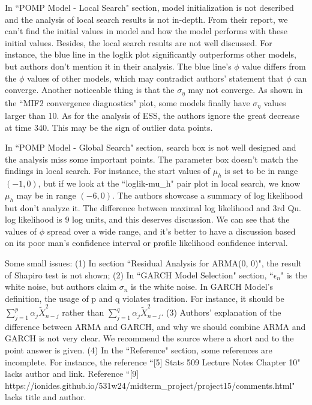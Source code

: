 \documentclass[12pt]{article}
\begin{document}
In ``POMP Model - Local Search" section, model initialization is not described and the analysis of local search results is not in-depth. From their report, we can't find the initial values in model and how the model performs with these initial values. Besides, the local search results are not well discussed. For instance, the blue line in the loglik plot significantly outperforms other models, but authors don't mention it in their analysis. The blue line's $\phi$ value differs from the $\phi$ values of other models, which may contradict authors' statement that $\phi$ can converge. Another noticeable thing is that the $\sigma_{\eta}$ may not converge. As shown in the ``MIF2 convergence diagnostics" plot, some models finally have $\sigma_{\eta}$ values larger than 10. As for the analysis of ESS, the authors ignore the great decrease at time 340. This may be the sign of outlier data points.


In ``POMP Model - Global Search" section, search box is not well designed and the analysis miss some important points. The parameter box doesn't match the findings in local search. For instance, the start values of $\mu_h$ is set to be in range $(-1, 0)$, but if we look at the ``loglik-mu\_h" pair plot in local search, we know $\mu_h$ may be in range $(-6, 0)$. The authors showcase a summary of log likelihood but don't analyze it. The difference between maximal log likelihood and 3rd Qu. log likelihood is 9 log units, and this deserves discussion. We can see that the values of $\phi$ spread over a wide range, and it's better to have a discussion based on its poor man's confidence interval or profile likelihood confidence interval.


Some small issues: (1) In section ``Residual Analysis for ARMA(0, 0)", the result of Shapiro test is not shown; (2) In ``GARCH Model Selection" section, ``$\epsilon_n$" is the white noise, but authors claim $\sigma_n$ is the white noise. In GARCH Model's definition, the usage of p and q violates tradition. For instance, it should be $\sum_{j = 1}^p \alpha_j \tilde{X}_{n - j}^2$ rather than $\sum_{j = 1}^q \alpha_j \tilde{X}_{n - j}^2$. (3) Authors' explanation of the difference between ARMA and GARCH, and why we should combine ARMA and GARCH is not very clear. We recommend the source \cite{2024/garch_and_arma} where a short and to the point answer is given. (4) In the ``Reference" section, some references are incomplete. For instance, the reference ``[5] Stats 509 Lecture Notes Chapter 10" lacks author and link. Reference ``[9] https://ionides.github.io/531w24/midterm\_project/project15/comments.html" lacks title and author.
\end{document}
